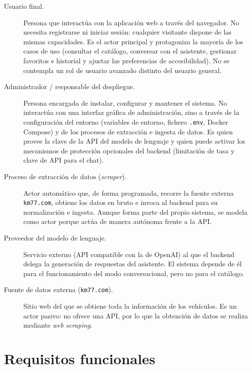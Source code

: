 \begin{description}
  \item[Usuario final.] Persona que interactúa con la aplicación web a través
        del navegador. No necesita registrarse ni iniciar sesión: cualquier
        visitante dispone de las mismas capacidades. Es el actor principal y
        protagoniza la mayoría de los casos de uso (consultar el catálogo,
        conversar con el asistente, gestionar favoritos e historial y ajustar
        las preferencias de accesibilidad). No se contempla un rol de usuario
        avanzado distinto del usuario general.

  \item[Administrador / responsable del despliegue.] Persona encargada de
        instalar, configurar y mantener el sistema. No interactúa con una
        interfaz gráfica de administración, sino a través de la configuración
        del entorno (variables de entorno, fichero \texttt{.env}, Docker
        Compose) y de los procesos de extracción e ingesta de datos. Es quien
        provee la clave de la API del modelo de lenguaje y quien puede activar
        los mecanismos de protección opcionales del backend (limitación de
        tasa y clave de API para el chat).

  \item[Proceso de extracción de datos (\emph{scraper}).] Actor automático
        que, de forma programada, recorre la fuente externa \texttt{km77.com},
        obtiene los datos en bruto e invoca al backend para su normalización e
        ingesta. Aunque forma parte del propio sistema, se modela como actor
        porque actúa de manera autónoma frente a la API.

  \item[Proveedor del modelo de lenguaje.] Servicio externo (API compatible
        con la de OpenAI) al que el backend delega la generación de respuestas
        del asistente. El sistema depende de él para el funcionamiento del
        modo conversacional, pero no para el catálogo.

  \item[Fuente de datos externa (\texttt{km77.com}).] Sitio web del que se
        obtiene toda la información de los vehículos. Es un actor pasivo: no
        ofrece una API, por lo que la obtención de datos se realiza mediante
        \emph{web scraping}.
\end{description}


\section{Requisitos funcionales}
\label{sec:req-funcionales}

